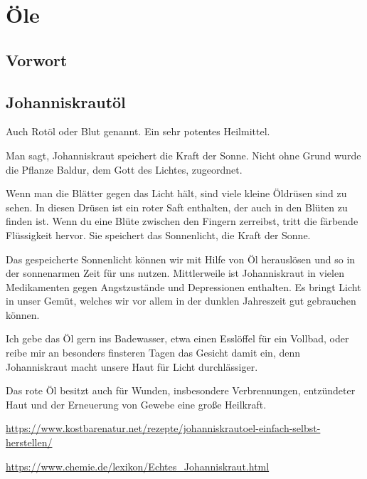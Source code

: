 \chapter{Öle}

\section{Vorwort}

\lipsum[1-5]
\newpage


\section{Johanniskrautöl}

Auch Rotöl oder Blut genannt. Ein sehr potentes Heilmittel.

Man sagt, Johanniskraut speichert die Kraft der Sonne. Nicht ohne Grund wurde die Pflanze Baldur, dem Gott des Lichtes, zugeordnet.

Wenn man die Blätter gegen das Licht hält, sind viele kleine Öldrüsen sind zu sehen. In diesen Drüsen ist ein roter Saft enthalten, der auch in den Blüten zu finden ist. Wenn du eine Blüte zwischen den Fingern zerreibst, tritt die färbende Flüssigkeit hervor. Sie speichert das Sonnenlicht, die Kraft der Sonne.

Das gespeicherte Sonnenlicht können wir mit Hilfe von Öl herauslösen und so in der sonnenarmen Zeit für uns nutzen. Mittlerweile ist Johanniskraut in vielen Medikamenten gegen Angstzustände und Depressionen enthalten. Es bringt Licht in unser Gemüt, welches wir vor allem in der dunklen Jahreszeit gut gebrauchen können.

Ich gebe das Öl gern ins Badewasser, etwa einen Esslöffel für ein Vollbad, oder reibe mir an besonders finsteren Tagen das Gesicht damit ein, denn Johanniskraut macht unsere Haut für Licht durchlässiger.

Das rote Öl besitzt auch für Wunden, insbesondere Verbrennungen, entzündeter Haut und der Erneuerung von Gewebe eine große Heilkraft.

\url{https://www.kostbarenatur.net/rezepte/johanniskrautoel-einfach-selbst-herstellen/}

\url{https://www.chemie.de/lexikon/Echtes_Johanniskraut.html}

        


